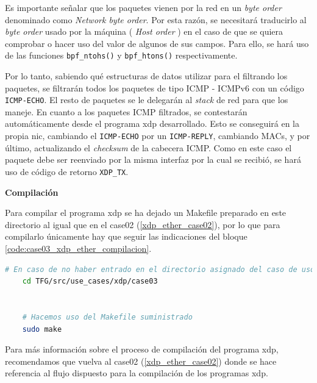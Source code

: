 Es importante señalar que los paquetes vienen por la red en un \textit{byte order} denominado como  \textit{Network byte order}. Por esta razón, se necesitará traducirlo al \textit{byte order} usado por la máquina ( \textit{Host order} ) en el caso de que se quiera comprobar o hacer uso del valor de algunos de sus campos. Para ello, se hará uso de las funciones \texttt{bpf\_ntohs()} y \texttt{bpf\_htons()} respectivamente.\\
\par

Por lo tanto, sabiendo qué estructuras de datos utilizar para el filtrando los paquetes, se filtrarán todos los paquetes de tipo ICMP - ICMPv6 con un código \texttt{ICMP-ECHO}. El resto de paquetes se le delegarán al \textit{stack} de red para que los maneje. En cuanto a los paquetes ICMP filtrados, se contestarán  automáticamente desde el programa \gls{xdp} desarrollado. Esto se conseguirá en la propia \gls{nic}, cambiando el \texttt{ICMP-ECHO} por un \texttt{ICMP-REPLY}, cambiando MACs, y por último, actualizando el \textit{checksum} de la cabecera ICMP. Como en este caso el paquete debe ser reenviado por la misma interfaz por la cual se recibió, se hará uso de código de retorno \texttt{XDP\_TX}.

\vspace{1cm}
\textbf{Compilación}\\
\par

Para compilar el programa \gls{xdp} se ha dejado un Makefile preparado en este directorio al igual que en el case02 (\ref{xdp_ether_case02}), por lo que para compilarlo únicamente hay que seguir las indicaciones del bloque \ref{code:case03_xdp_ether_compilacion}.

\begin{lstlisting}[language= bash, style=Consola, caption={Compilación programa XDP - Case03},label=code:case03_xdp_ether_compilacion]
    # En caso de no haber entrado en el directorio asignado del caso de uso
    cd TFG/src/use_cases/xdp/case03
    
    
    # Hacemos uso del Makefile suministrado 
    sudo make
\end{lstlisting}
\vspace{0.5cm}

Para más información sobre el proceso de compilación del programa \gls{xdp}, recomendamos que vuelva al case02 (\ref{xdp_ether_case02}) donde se hace referencia al flujo dispuesto para la compilación de los programas \gls{xdp}.


